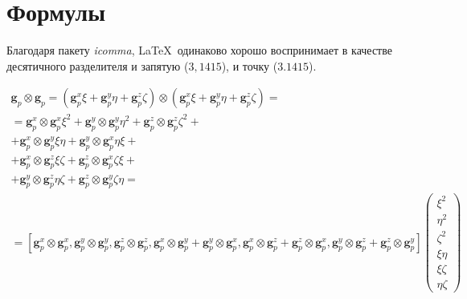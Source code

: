 
\section{Формулы} \label{sect1_3}

Благодаря пакету \textit{icomma}, \LaTeX~одинаково хорошо воспринимает в качестве десятичного разделителя и запятую ($3,1415$), и точку ($3.1415$).

\begin{multline}
    \mathbf{g}_p \otimes \mathbf{g}_p = (\mathbf{g}_p^x \xi
    + \mathbf{g}_p^y \eta
    + \mathbf{g}_p^z \zeta)
    \otimes
    (\mathbf{g}_p^x \xi
    + \mathbf{g}_p^y \eta
    + \mathbf{g}_p^z \zeta) =
    \nonumber \\
    = \mathbf{g}_p^x \otimes \mathbf{g}_p^x \xi^2
    + \mathbf{g}_p^y \otimes \mathbf{g}_p^y \eta^2
    + \mathbf{g}_p^z \otimes \mathbf{g}_p^z \zeta^2+\\
    + \mathbf{g}_p^x \otimes \mathbf{g}_p^y \xi \eta
    + \mathbf{g}_p^y\otimes  \mathbf{g}_p^x \eta \xi+\\
    + \mathbf{g}_p^x \otimes \mathbf{g}_p^z \xi \zeta
    + \mathbf{g}_p^z\otimes  \mathbf{g}_p^x \zeta \xi+\\
    + \mathbf{g}_p^y \otimes \mathbf{g}_p^z \eta \zeta
    + \mathbf{g}_p^z \otimes \mathbf{g}_p^y \zeta \eta
    =\\
    =  [\mathbf{g}_p^x \otimes \mathbf{g}_p^x,
        \mathbf{g}_p^y \otimes \mathbf{g}_p^y,
        \mathbf{g}_p^z \otimes \mathbf{g}_p^z,
        \mathbf{g}_p^x \otimes \mathbf{g}_p^y
        + \mathbf{g}_p^y \otimes \mathbf{g}_p^x,
        \mathbf{g}_p^x \otimes \mathbf{g}_p^z
        + \mathbf{g}_p^z \otimes \mathbf{g}_p^x,
        \mathbf{g}_p^y \otimes \mathbf{g}_p^z
        + \mathbf{g}_p^z \otimes \mathbf{g}_p^y]
        \left( \begin{array}{ccc}
                \xi^2 \\
                \eta^2 \\
                \zeta^2 \\
                \xi \eta \\
                \xi \zeta \\
                \eta \zeta
            \end{array}
        \right)
\end{multline}

